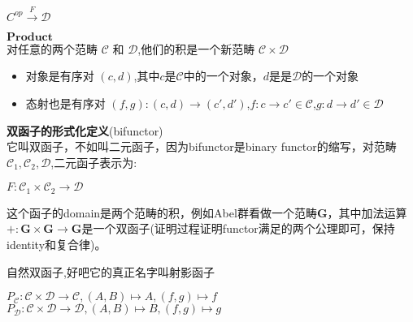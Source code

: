 \documentclass{article}
\begin{document}
\begin{center}
$C^{op} \xrightarrow{F} \mathcal{D}$ \\
\end{center}

\begin{flushleft}
$\textbf{Product}$ \\
对任意的两个范畴 $\mathcal{C}$ 和 $\mathcal{D}$,他们的积是一个新范畴 $\mathcal{C} \times \mathcal{D}$\\
\begin{itemize}
	\item 对象是有序对 $\left( c,d \right)$,其中$c$是$\mathcal{C}$中的一个对象，$d$是是$\mathcal{D}$的一个对象 
	\item 态射也是有序对 $\left(f,g \right) \colon \left(c,d\right) \rightarrow \left(c',d'\right)$,$f\colon c \rightarrow c' \in \mathcal{C}$,$g \colon d \rightarrow d' \in \mathcal{D}$
\end{itemize}
\end{flushleft}


\begin{flushleft}
\textbf{双函子的形式化定义}(bifunctor) \\ 
它叫双函子，不如叫二元函子，因为bifunctor是binary functor的缩写，对范畴$\mathcal{C}_1,\mathcal{C}_2,\mathcal{D}$,二元函子表示为:\\

\begin{center}
$F \colon \mathcal{C}_1 \times \mathcal{C}_2 \rightarrow \mathcal{D}$
\end{center}

这个函子的domain是两个范畴的积，例如Abel群看做一个范畴$\mathbf{G}$，其中加法运算 $+ \colon \mathbf{G} \times \mathbf{G} \rightarrow \mathbf{G}$是一个双函子(证明过程证明functor满足的两个公理即可，保持identity和复合律)。 

\end{flushleft}


\begin{flushleft}
$\textbf{自然双函子}$,好吧它的真正名字叫$\textbf{射影函子}$ \\
\begin{center}
$P_{\mathcal{C}} \colon \mathcal{C} \times \mathcal{D} \rightarrow \mathcal{C},\left( A,B \right)\mapsto A,\left( f,g \right)\mapsto f$ \\ \vbox{}
$P_{\mathcal{D}} \colon \mathcal{C} \times \mathcal{D} \rightarrow \mathcal{D},\left( A,B \right)\mapsto B,\left( f,g \right)\mapsto g$ \\
\end{center} 
\end{flushleft}
\end{document}
